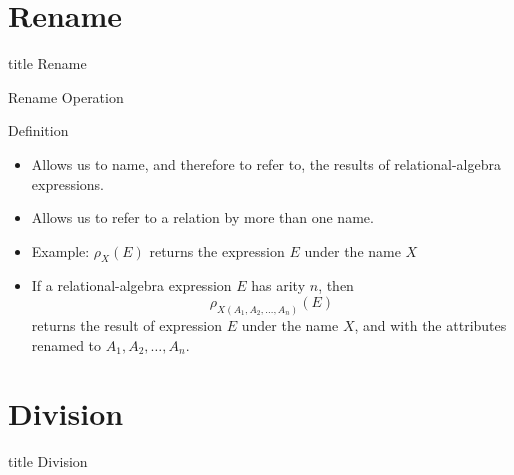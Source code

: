 \documentclass[aspectratio=169, xcolor=dvipsnames]{beamer}
\begin{document}
\section{Rename}
\begin{frame}
  \vfill
  \centering
  \begin{beamercolorbox}[sep=8pt,center,shadow=true,rounded=true]{title}
    Rename\par%
  \end{beamercolorbox}
  \vfill
\end{frame}

\begin{frame}{Rename Operation}
    \begin{block}{Definition}
        \begin{itemize}[<+->]
            \item Allows us to name, and therefore to refer to, the results of relational-algebra expressions.
            \item Allows us to refer to a relation by more than one name.
            \item Example: $\rho_X(E)$ returns the expression $E$ under the name $X$
            \item If a relational-algebra expression $E$ has arity $n$, then
            \[ \rho_{X(A_1, A_2, \dots, A_n)}(E) \]
            returns the result of expression $E$ under the name $X$, and with the attributes renamed to $A_1, A_2, \dots, A_n$.
        \end{itemize}
    \end{block}
\end{frame}

\section{Division}
\begin{frame}
  \vfill
  \centering
  \begin{beamercolorbox}[sep=8pt,center,shadow=true,rounded=true]{title}
    Division\par%
  \end{beamercolorbox}
  \vfill
\end{frame}
\end{document}
